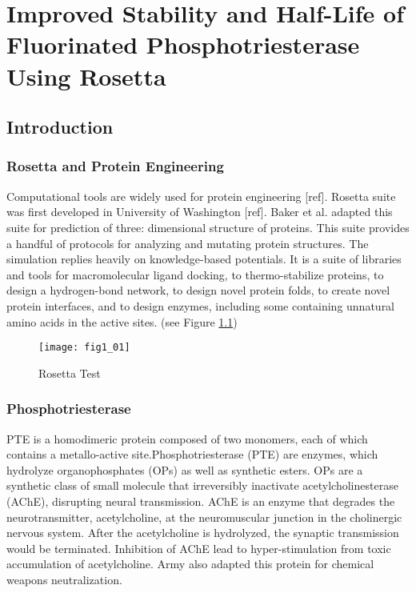 \chapter{Improved Stability and Half-Life of Fluorinated Phosphotriesterase
Using Rosetta} 
\label{chap:rosetta}

\begin{refsection}

\section{Introduction}

\subsection{Rosetta and Protein Engineering}
\label{sec:rosetta}

Computational tools are widely used for protein engineering [ref]. Rosetta
suite was first developed in University of Washington [ref]. Baker et al.
adapted this suite for prediction of three: dimensional structure of proteins.
This suite provides a handful of protocols for analyzing and mutating protein
structures. The simulation replies heavily on knowledge-based potentials. It is
a suite of libraries and tools for macromolecular ligand docking, to
thermo-stabilize proteins, to design a hydrogen-bond network, to design novel
protein folds, to create novel protein interfaces, and to design enzymes,
including some containing unnatural amino acids in the active sites. (see
Figure \ref{fig:test})
\begin{figure}[h!] \centering \texttt{[image: fig1\_01]}
    \caption[This is test]{Rosetta Test}\label{fig:test}

\end{figure}

\subsection{Phosphotriesterase} 
\label{sec:pte}

PTE is a homodimeric protein composed of two monomers, each of which contains a
metallo-active site.Phosphotriesterase (PTE) are enzymes, which hydrolyze
organophosphates (OPs) as well as synthetic esters.\cite{Ghanem2005a} OPs are a
synthetic class of small molecule that irreversibly inactivate
acetylcholinesterase (AChE), disrupting neural transmission. AChE is an enzyme
that degrades the neurotransmitter, acetylcholine, at the neuromuscular
junction in the cholinergic nervous system. After the acetylcholine is
hydrolyzed, the synaptic transmission would be terminated. Inhibition of AChE
lead to hyper-stimulation from toxic accumulation of
acetylcholine.\cite{Soreq2001} Army also adapted this protein for chemical
weapons neutralization. \cite{Yang2014a}


\end{refsection}
